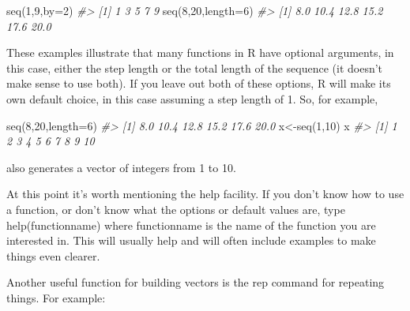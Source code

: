 \documentclass[
]{book}
\newenvironment{Shaded}{\begin{snugshade}}{\end{snugshade}}
\newcommand{\AttributeTok}[1]{\textcolor[rgb]{0.77,0.63,0.00}{#1}}
\newcommand{\CommentTok}[1]{\textcolor[rgb]{0.56,0.35,0.01}{\textit{#1}}}
\newcommand{\DecValTok}[1]{\textcolor[rgb]{0.00,0.00,0.81}{#1}}
\newcommand{\FunctionTok}[1]{\textcolor[rgb]{0.00,0.00,0.00}{#1}}
\newcommand{\NormalTok}[1]{#1}
\newcommand{\OtherTok}[1]{\textcolor[rgb]{0.56,0.35,0.01}{#1}}
\begin{document}
\begin{Shaded}
\begin{Highlighting}[]
\FunctionTok{seq}\NormalTok{(}\DecValTok{1}\NormalTok{,}\DecValTok{9}\NormalTok{,}\AttributeTok{by=}\DecValTok{2}\NormalTok{)}
\CommentTok{\#\textgreater{} [1] 1 3 5 7 9}
\FunctionTok{seq}\NormalTok{(}\DecValTok{8}\NormalTok{,}\DecValTok{20}\NormalTok{,}\AttributeTok{length=}\DecValTok{6}\NormalTok{)}
\CommentTok{\#\textgreater{} [1]  8.0 10.4 12.8 15.2 17.6 20.0}
\end{Highlighting}
\end{Shaded}

These examples illustrate that many functions in R have optional arguments, in this case, either the step length or the total length of the sequence (it doesn't make sense to use both). If you leave out both of these options, R will make its own default choice, in this case assuming a step length
of 1. So, for example,

\begin{Shaded}
\begin{Highlighting}[]
\FunctionTok{seq}\NormalTok{(}\DecValTok{8}\NormalTok{,}\DecValTok{20}\NormalTok{,}\AttributeTok{length=}\DecValTok{6}\NormalTok{)}
\CommentTok{\#\textgreater{} [1]  8.0 10.4 12.8 15.2 17.6 20.0}
\NormalTok{x}\OtherTok{\textless{}{-}}\FunctionTok{seq}\NormalTok{(}\DecValTok{1}\NormalTok{,}\DecValTok{10}\NormalTok{)}
\NormalTok{x}
\CommentTok{\#\textgreater{}  [1]  1  2  3  4  5  6  7  8  9 10}
\end{Highlighting}
\end{Shaded}

also generates a vector of integers from 1 to 10.

At this point it's worth mentioning the help facility. If you don't know how to use a function,
or don't know what the options or default values are, type help(functionname) where functionname is the name of the function you are interested in. This will usually help and will often include examples to make things even clearer.

Another useful function for building vectors is the rep command for repeating things. For
example:
\end{document}
